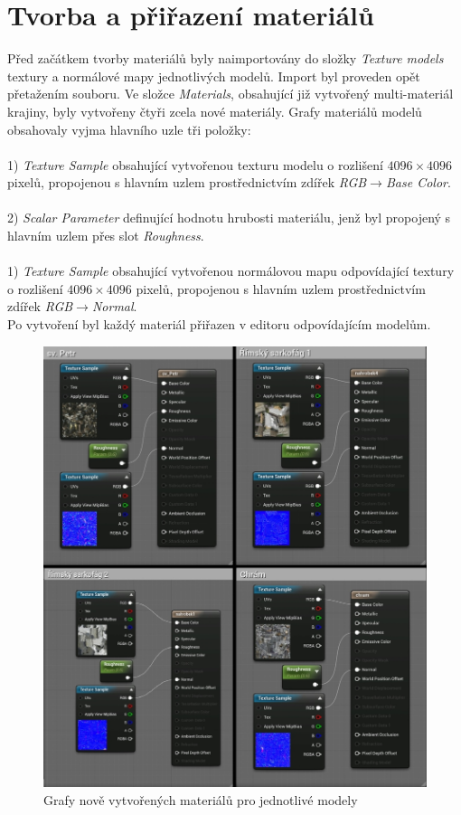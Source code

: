 \documentclass[a4paper, 12pt]{report}
\begin{document}
\section{Tvorba a přiřazení materiálů}
Před začátkem tvorby materiálů byly naimportovány do složky \textit{Texture models} textury a normálové mapy jednotlivých modelů. Import byl proveden opět přetažením souboru. Ve složce \textit{Materials}, obsahující již vytvořený multi-materiál krajiny, byly vytvořeny čtyři zcela nové materiály. Grafy materiálů modelů obsahovaly vyjma hlavního uzle tři položky: \\
\\
1) \textit{Texture Sample} obsahující vytvořenou texturu modelu o rozlišení $4096\times4096$ pixelů, propojenou s hlavním uzlem prostřednictvím zdířek \textit{RGB}$\rightarrow$\textit{Base Color}.\\
\\
2) \textit{Scalar Parameter} definující hodnotu hrubosti materiálu, jenž byl propojený s hlavním uzlem přes slot \textit{Roughness}.\\
\\
1) \textit{Texture Sample} obsahující vytvořenou normálovou mapu odpovídající textury o rozlišení $4096\times4096$ pixelů, propojenou s hlavním uzlem prostřednictvím zdířek \textit{RGB}$\rightarrow$\textit{Normal}.\\
Po vytvoření byl každý materiál přiřazen v editoru odpovídajícím modelům. 

\begin{figure}[h!]
	\centering
	\includegraphics[width=12cm]{modely_materialy.jpg}
	\caption{Grafy nově vytvořených materiálů pro jednotlivé modely}
\end{figure}
\end{document}
